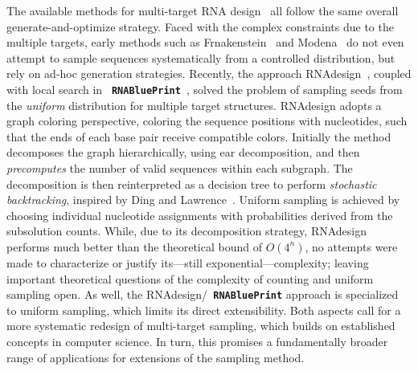 \documentclass[]{bmcart}
\newcommand{\Def}[1]{\emph{#1}}
\newcommand{\parHead}[1]{\Final{\paragraph{#1}}}
\newcommand{\Final}[1]{\begingroup\color{red!70!black}#1\endgroup}
\renewcommand{\Final}[1]{}
\newcommand{\Nuc}[1]{{\sf #1}}
\newcommand{\Cb}{\Nuc{C}}
\newcommand{\Gb}{\Nuc{G}}
\newcommand{\GCb}{\Gb\Cb}
\newcommand{\Software}[1]{{\ttfamily #1}}
\newcommand{\RNAblueprint}{{\tt \bfseries{}\color{black!85} RNA\textcolor{blue!70!black}{Blue}Print}}
\newcommand{\citep}[1]{\cite{#1}}
\newcommand{\revised}[1]{{\color{red} #1}}
\begin{document}
\parHead{Specificities and similarities of multi-target design.}
The available methods for multi-target RNA design~\citep{Lyngsoe2012,HoenerzuSiederdissen2013,Taneda2015,Hammer2017} all follow the same overall generate-and-optimize strategy.
%
Faced with the complex constraints due to the multiple targets, early methods such as \Software{Frnakenstein}~\citep{Lyngsoe2012} and \Software{Modena}~\citep{Taneda2015} \revised{do not even attempt to sample sequences systematically from a controlled distribution}, but rely on ad-hoc generation strategies.
%
Recently, the approach \Software{RNAdesign}~\citep{HoenerzuSiederdissen2013}, coupled with local
search in \RNAblueprint{}~\citep{Hammer2017}, solved the
problem of sampling seeds from the \emph{uniform} distribution for multiple
target structures. \Software{RNAdesign} adopts a graph coloring perspective,
coloring the sequence positions with nucleotides, such that the ends of each base pair receive compatible colors. Initially the method decomposes the graph hierarchically, using ear decomposition, and then \Def{precomputes} the number of valid sequences
within each subgraph. The decomposition is then reinterpreted as a
decision tree to perform \Def{stochastic backtracking}, inspired by
Ding and Lawrence~\citep{Ding2003}. Uniform sampling is achieved by
choosing individual nucleotide assignments with probabilities derived
from the subsolution counts. While, due to its decomposition strategy, 
\Software{RNAdesign} performs much better than the theoretical bound of $O(4^n)$, no attempts were made to characterize or justify its---still exponential---complexity; leaving important theoretical questions of the complexity of counting and uniform sampling open.
As well, the \Software{RNAdesign}/\RNAblueprint{} approach is specialized to uniform sampling, which limits its direct extensibility. Both aspects call for a more systematic redesign of multi-target sampling, which builds on established concepts in computer science. In turn, this promises a fundamentally broader range of applications for extensions of the sampling method.

%
 
\end{document}

